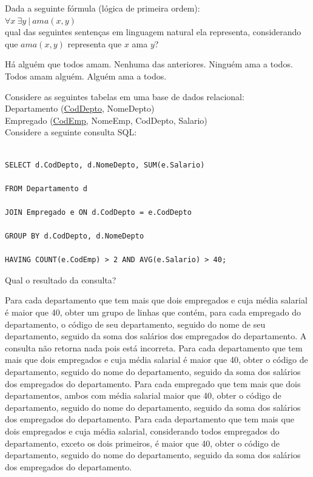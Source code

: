 \documentclass[12pt, addpoints]{exam}
\begin{document}
\begin{questions}
\question

Dada a seguinte fórmula (lógica de primeira ordem):\\

$\forall x \ \exists y \ | \ ama(x,y)$ \\

qual das seguintes sentenças em linguagem natural ela representa, considerando que \( ama(x,y) \) representa que \( x \) ama \( y \)?


\begin{choices}
\choice Há alguém que todos amam.
\choice Nenhuma das anteriores.
\choice Ninguém ama a todos.
\choice Todos amam alguém.
\choice Alguém ama a todos.
\end{choices}

\question

Considere as seguintes tabelas em uma base de dados relacional:\\

Departamento (\underline{CodDepto}, NomeDepto)\\

Empregado (\underline{CodEmp}, NomeEmp, CodDepto, Salario)\\

Considere a seguinte consulta SQL:

\begin{verbatim}

SELECT d.CodDepto, d.NomeDepto, SUM(e.Salario)

FROM Departamento d

JOIN Empregado e ON d.CodDepto = e.CodDepto

GROUP BY d.CodDepto, d.NomeDepto

HAVING COUNT(e.CodEmp) > 2 AND AVG(e.Salario) > 40;

\end{verbatim}



Qual o resultado da consulta?
\begin{choices}
\choice Para cada departamento que tem mais que dois empregados e cuja média salarial é maior que 40, obter um grupo de linhas que contém, para cada empregado do departamento, o código de seu departamento, seguido do nome de seu departamento, seguido da soma dos salários dos empregados do departamento.
\choice A consulta não retorna nada pois está incorreta.
\choice Para cada departamento que tem mais que dois empregados e cuja média salarial é maior que 40, obter o código de departamento, seguido do nome do departamento, seguido da soma dos salários dos empregados do departamento.
\choice Para cada empregado que tem mais que dois departamentos, ambos com média salarial maior que 40, obter o código de departamento, seguido do nome do departamento, seguido da soma dos salários dos empregados do departamento.
\choice Para cada departamento que tem mais que dois empregados e cuja média salarial, considerando todos empregados do departamento, exceto os dois primeiros, é maior que 40, obter o código de departamento, seguido do nome do departamento, seguido da soma dos salários dos empregados do departamento.
\end{choices}


\end{questions}
\end{document}
